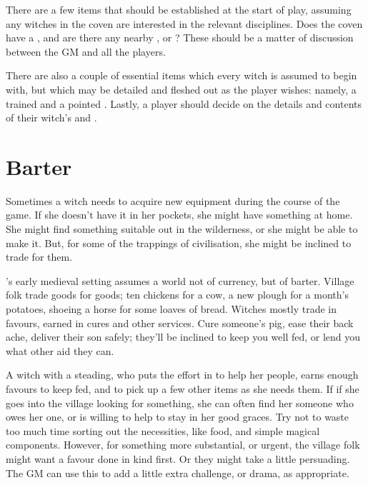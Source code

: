 There are a few items that should be established at the start of play, assuming any witches in the coven are interested in the relevant disciplines.
Does the coven have a , and are there any nearby , or ?
These should be a matter of discussion between the GM and all the players.

There are also a couple of essential items which every witch is assumed to begin with, but which may be detailed and fleshed out as the player wishes: namely, a trained  and a pointed {\hat}.
Lastly, a player should decide on the details and contents of their witch's  and .



\section{Barter}

Sometimes a witch needs to acquire new equipment during the course of the game.
If she doesn't have it in her pockets, she might have something at home.
She might find something suitable out in the wilderness, or she might be able to make it.
But, for some of the trappings of civilisation, she might be inclined to trade for them.

's early medieval setting assumes a world not of currency, but of barter.
Village folk trade goods for goods; ten chickens for a cow, a new plough for a month's potatoes, shoeing a horse for some loaves of bread.
Witches mostly trade in favours, earned in cures and other services.
Cure someone's pig, ease their back ache, deliver their son safely; they'll be inclined to keep you well fed, or lend you what other aid they can.

A witch with a steading, who puts the effort in to help her people, earns enough favours to keep fed, and to pick up a few other items as she needs them.
If if she goes into the village looking for something, she can often find her someone who owes her one, or is willing to help to stay in her good graces.
Try not to waste too much time sorting out the necessities, like food, and simple magical components.
However, for something more substantial, or urgent, the village folk might want a favour done in kind first.
Or they might take a little persuading.
The GM can use this to add a little extra challenge, or drama, as appropriate.



